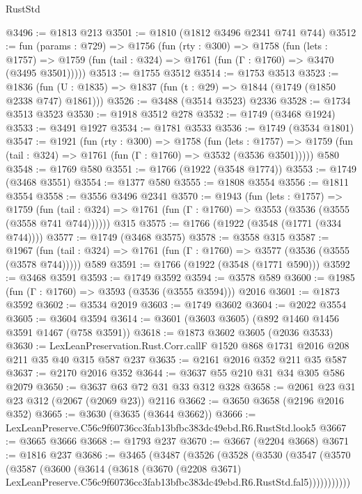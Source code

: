 \begin{lexlean}{RustStd}
\begin{coremodule}
@3496 := @1813 @213
@3501 := @1810 (@1812 @3496 @2341 @741 @744)
@3512 := fun (params : @729) =>
  @1756
    (fun (rty : @300) =>
    @1758
      (fun (lets : @1757) =>
      @1759 (fun (tail : @324) => @1761 (fun (Γ : @1760) => @3470 (@3495 @3501)))))
@3513 := @1755 @3512
@3514 := @1753 @3513
@3523 := @1836 (fun (U : @1835) => @1837 (fun (t : @29) => @1844 (@1749 (@1850 @2338 @747) @1861)))
@3526 := @3488 (@3514 @3523) @2336
@3528 := @1734 @3513 @3523
@3530 := @1918 @3512 @278
@3532 := @1749 (@3468 @1924)
@3533 := @3491 @1927
@3534 := @1781 @3533
@3536 := @1749 (@3534 @1801)
@3547 := @1921
    (fun (rty : @300) =>
    @1758
      (fun (lets : @1757) =>
      @1759 (fun (tail : @324) => @1761 (fun (Γ : @1760) => @3532 (@3536 @3501)))))
    @580
@3548 := @1769 @580
@3551 := @1766 (@1922 (@3548 @1774))
@3553 := @1749 (@3468 @3551)
@3554 := @1377 @580
@3555 := @1808 @3554
@3556 := @1811 @3554
@3558 := @3556 @3496 @2341
@3570 := @1943
    (fun (lets : @1757) =>
    @1759 (fun (tail : @324) => @1761 (fun (Γ : @1760) => @3553 (@3536 (@3555 (@3558 @741 @744))))))
    @315
@3575 := @1766 (@1922 (@3548 (@1771 (@334 @744))))
@3577 := @1749 (@3468 @3575)
@3578 := @3558 @315
@3587 := @1967
    (fun (tail : @324) => @1761 (fun (Γ : @1760) => @3577 (@3536 (@3555 (@3578 @744)))))
    @589
@3591 := @1766 (@1922 (@3548 (@1771 @590)))
@3592 := @3468 @3591
@3593 := @1749 @3592
@3594 := @3578 @589
@3600 := @1985 (fun (Γ : @1760) => @3593 (@3536 (@3555 @3594))) @2016
@3601 := @1873 @3592
@3602 := @3534 @2019
@3603 := @1749 @3602
@3604 := @2022 @3554
@3605 := @3604 @3594
@3614 := @3601 (@3603 @3605) (@892 @1460 @1456 @3591 @1467 (@758 @3591))
@3618 := @1873 @3602 @3605 (@2036 @3533)
@3630 := LexLeanPreservation.Rust.Corr.callF @1520 @868 @1731 @2016 @208 @211 @35 @40 @315 @587 @237
@3635 := @2161 @2016 @352 @211 @35 @587
@3637 := @2170 @2016 @352
@3644 := @3637 @55 @210 @31 @34 @305 @586 @2079
@3650 := @3637 @63 @72 @31 @33 @312 @328
@3658 := @2061 @23 @31 @23 @312 (@2067 (@2069 @23)) @2116
@3662 := @3650 @3658 (@2196 @2016 @352)
@3665 := @3630 (@3635 (@3644 @3662))
@3666 := LexLeanPreserve.C56c9f60736cc3fab13bfbc383dc49ebd.R6.RustStd.look5
@3667 := @3665 @3666
@3668 := @1793 @237
@3670 := @3667 (@2204 @3668)
@3671 := @1816 @237
@3686 := @3465
    (@3487
      (@3526
        (@3528
          (@3530
            (@3547
              (@3570
                (@3587
                  (@3600
                    (@3614
                      (@3618
                        (@3670
                          (@2208 @3671)
                          LexLeanPreserve.C56c9f60736cc3fab13bfbc383dc49ebd.R6.RustStd.fal5)))))))))))

\end{coremodule}
\end{lexlean}
